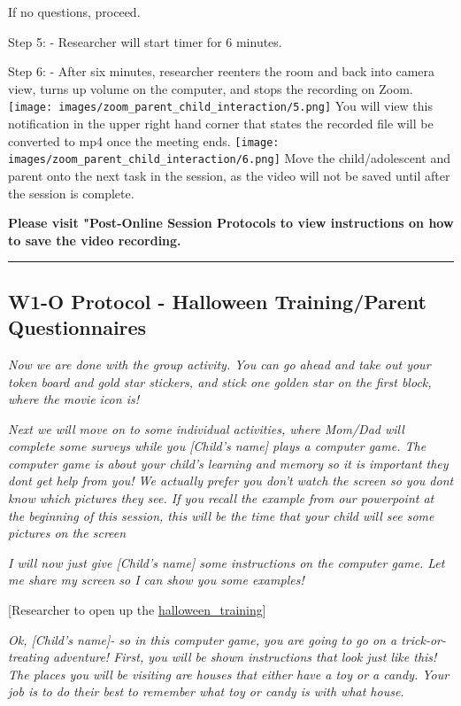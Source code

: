 \documentclass[
]{book}
\begin{document}
If no questions, proceed.

Step 5:
- Researcher will start timer for 6 minutes.

Step 6:
- After six minutes, researcher reenters the room and back into camera view, turns up volume on the computer, and stops the recording on Zoom. \texttt{[image: images/zoom\_parent\_child\_interaction/5.png]} You will view this notification in the upper right hand corner that states the recorded file will be converted to mp4 once the meeting ends. \texttt{[image: images/zoom\_parent\_child\_interaction/6.png]} Move the child/adolescent and parent onto the next task in the session, as the video will not be saved until after the session is complete.

\textbf{Please visit "Post-Online Session Protocols to view instructions on how to save the video recording.}

\begin{center}\rule{0.5\linewidth}{0.5pt}\end{center}

\hypertarget{w1-o-protocol---halloween-trainingparent-questionnaires}{%
\subsection{W1-O Protocol - Halloween Training/Parent Questionnaires}\label{w1-o-protocol---halloween-trainingparent-questionnaires}}

\emph{Now we are done with the group activity. You can go ahead and take out your token board and gold star stickers, and stick one golden star on the first block, where the movie icon is!}

\emph{Next we will move on to some individual activities, where Mom/Dad will complete some surveys while you {[}Child's name{]} plays a computer game. The computer game is about your child's learning and memory so it is important they dont get help from you! We actually prefer you don't watch the screen so you dont know which pictures they see. If you recall the example from our powerpoint at the beginning of this session, this will be the time that your child will see some pictures on the screen}

\emph{I will now just give {[}Child's name{]} some instructions on the computer game. Let me share my screen so I can show you some examples!}

{[}Researcher to open up the \href{https://ucla.app.box.com/file/709481066655}{halloween\_training}{]}

\emph{Ok, {[}Child's name{]}- so in this computer game, you are going to go on a trick-or-treating adventure! First, you will be shown instructions that look just like this! The places you will be visiting are houses that either have a toy or a candy. Your job is to do their best to remember what toy or candy is with what house.}
\end{document}

